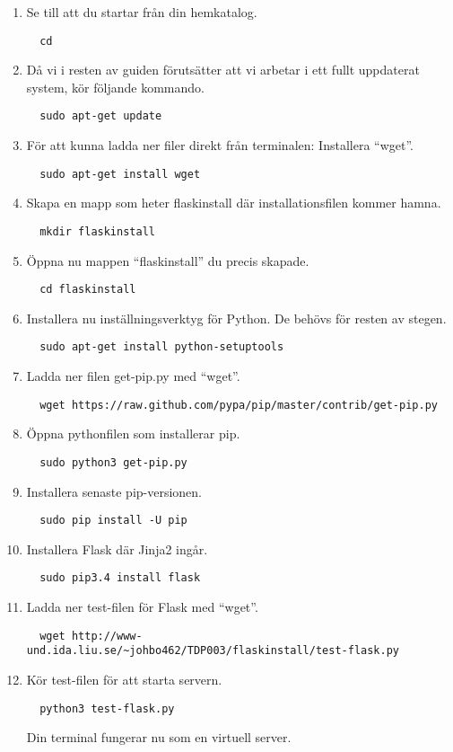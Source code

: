 \documentclass{TDP003mall}
\begin{document}
\begin{enumerate}
  \item Se till att du startar från din hemkatalog.
          \begin{lstlisting}
  cd  
      \end{lstlisting}
  \item Då vi i resten av guiden förutsätter att vi arbetar i ett fullt uppdaterat system, kör följande kommando.
      \begin{lstlisting}
  sudo apt-get update  
      \end{lstlisting}
  \item För att kunna ladda ner filer direkt från terminalen: Installera ``wget''. 
    \begin{lstlisting}
  sudo apt-get install wget
    \end{lstlisting}
  \item Skapa en mapp som heter flaskinstall där installationsfilen kommer hamna.
    \begin{lstlisting}
  mkdir flaskinstall
    \end{lstlisting}
  \item Öppna nu mappen ``flaskinstall'' du precis skapade.
    \begin{lstlisting}
  cd flaskinstall
    \end{lstlisting}
  \item Installera nu inställningsverktyg för Python. De behövs för resten av stegen.
    \begin{lstlisting}
  sudo apt-get install python-setuptools
    \end{lstlisting}
  \item Ladda ner filen get-pip.py med ``wget''.
    \begin{lstlisting}
  wget https://raw.github.com/pypa/pip/master/contrib/get-pip.py
    \end{lstlisting}
  \item Öppna pythonfilen som installerar pip.
    \begin{lstlisting}
  sudo python3 get-pip.py
    \end{lstlisting}
  \item Installera senaste pip-versionen.
    \begin{lstlisting}
  sudo pip install -U pip
    \end{lstlisting}
  \item Installera Flask där Jinja2 ingår. 
    \begin{lstlisting}
  sudo pip3.4 install flask
    \end{lstlisting}
  \item Ladda ner test-filen för Flask med ``wget''. 
    \begin{lstlisting}
  wget http://www-und.ida.liu.se/~johbo462/TDP003/flaskinstall/test-flask.py
    \end{lstlisting}
  \item Kör test-filen för att starta servern. 
    \begin{lstlisting}
  python3 test-flask.py
    \end{lstlisting}

Din terminal fungerar nu som en virtuell server. 
\end{enumerate}
\end{document}
